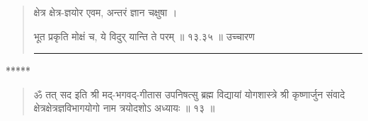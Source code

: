 \begin{quotation}

क्षेत्र क्षेत्र-ज्ञयोर एवम, अन्तरं ज्ञान चक्षुषा  ।  

भूत प्रकृति मोक्षं च, ये विदुर् यान्ति ते परम्‌  ॥ १३.३५ ॥  उच्चारण

\noindent\rule{16cm}{0.4pt} 
\end{quotation}




\begin{center} ***** \end{center}

\begin{quotation}

ॐ तत् सद इति श्री मद्-भगवद्-गीतास उपनिषत्सु ब्रह्म विद्यायां योगशास्त्रे श्री कृष्णार्जुन संवादे  क्षेत्रक्षेत्रज्ञविभागयोगो नाम त्रयोदशोऽ अध्यायः  ॥  १३  ॥ 

\end{quotation} 
